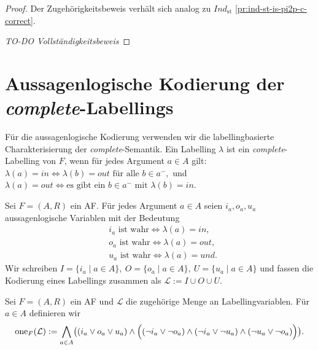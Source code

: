 \begin{proof}
    Der Zugehörigkeitsbeweis verhält sich analog zu \(\textit{Ind}_{\mathrm{st}}\) \ref{pr:ind-st-is-pi2p-c-correct}.
    
    \emph{TO-DO Vollständigkeitsbeweis}
\end{proof}

\section{Aussagenlogische Kodierung der \textit{complete}-Labellings}
Für die aussagenlogische Kodierung verwenden wir die labellingbasierte
Charakterisierung der \textit{complete}-Semantik. Ein Labelling \(\lambda\)
ist ein \textit{complete}-Labelling von \(F\), wenn für jedes Argument
\(a\in A\) gilt:
\(
    \lambda(a)=\mathit{in}
    \Longleftrightarrow
    \lambda(b)=\mathit{out}
    \text{ für alle } b\in a^-,
\)
und
\(    \lambda(a)=\mathit{out}
    \Longleftrightarrow
    \text{es gibt ein } b\in a^-
    \text{ mit } \lambda(b)=\mathit{in}.\)

\begin{Definition}
    \label{def:vars}
    Sei \(F = (A,R)\) ein AF. Für jedes Argument \(a \in A\) seien \(i_a,o_a,u_a\) aussagenlogische Variablen mit der Bedeutung
    \begin{align*}
        & i_a \text{ ist wahr}\Longleftrightarrow \lambda(a)=\mathit{in},\\
        & o_a \text{ ist wahr}\Longleftrightarrow \lambda(a)=\mathit{out},\\
        & u_a \text{ ist wahr}\Longleftrightarrow \lambda(a)=\mathit{und}.
    \end{align*}
    Wir schreiben \(I=\{i_a\mid a\in A\},~O=\{o_a\mid a\in A\},~U=\{u_a\mid a\in A\}\)
    und fassen die Kodierung eines Labellings zusammen als \(\mathcal{L} := I \cup O \cup U.\)
\end{Definition}

\begin{Definition}
    \label{def:pl-one}
    Sei \(F=(A,R)\) ein AF und \(\mathcal{L}\) die zugehörige Menge an Labellingvariablen.
    Für \(a\in A\) definieren wir
    \[
        \mathrm{one}_F(\mathcal{L})
        :=
        \bigwedge_{a \in A}
        \bigl(
            (i_a \lor o_a \lor u_a)
            \land
            \Bigl(
                (\neg i_a \lor \neg o_a)
                \land
                (\neg i_a \lor \neg u_a)
                \land
                (\neg u_a \lor \neg o_a)
            \Bigr)
        \bigr).
    \]
\end{Definition}

